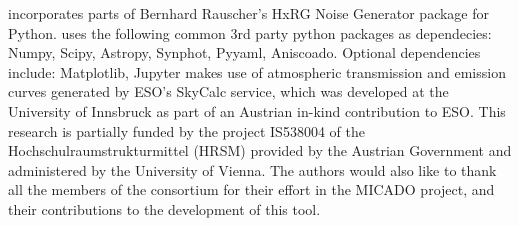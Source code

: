 \ScopeSim{} incorporates parts of Bernhard Rauscher's HxRG Noise Generator package for Python\cite{nghxrg}.
\ScopeSim{} uses the following common 3rd party python packages as dependecies: Numpy\cite{numpy}, Scipy\cite{scipy}, Astropy\cite{astropy1, astropy2}, Synphot\cite{synphot}, Pyyaml, Aniscoado\cite{anisocado}.
Optional dependencies include: Matplotlib\cite{matplotlib}, Jupyter\cite{jupyter}
\ScopeSim{} makes use of atmospheric transmission and emission curves generated by ESO's SkyCalc service, which was developed at the University of Innsbruck as part of an Austrian in-kind contribution to ESO\cite{skycalc1, skycalc2}.
This research is partially funded by the project IS538004 of the Hochschulraumstrukturmittel (HRSM) provided by the Austrian Government and administered by the University of Vienna.
The authors would also like to thank all the members of the consortium for their effort in the MICADO project, and their contributions to the development of this tool.
